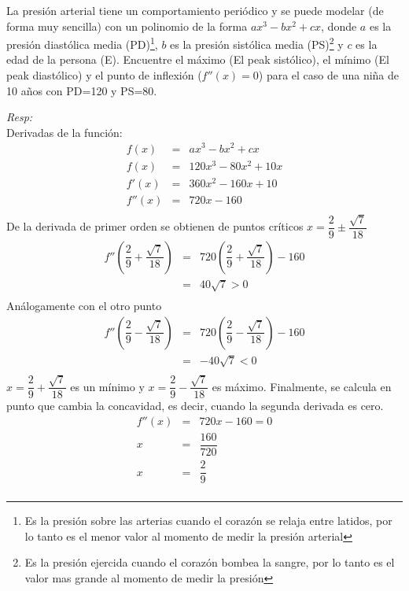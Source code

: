 \begin{myexample}
 La presión arterial tiene un comportamiento periódico y se puede modelar (de forma muy sencilla) con un polinomio de la forma $ax^{3}-bx^{2}+cx$, donde $a$ es la presión diastólica media (PD)\footnote{Es la presión sobre las arterias cuando el corazón se relaja entre latidos, por lo tanto es el menor valor al momento de medir la presión arterial}, $b$ es la presión sistólica media (PS)\footnote{Es la presión ejercida cuando el corazón bombea la sangre, por lo tanto es el valor mas grande al momento de medir la presión} y $c$ es la edad de la persona (E). Encuentre el máximo (El peak sistólico), el mínimo (El peak diastólico) y el punto de inflexión ($f''(x)=0$) para el caso de una niña de 10 años con PD=120 y PS=80.\\
\end{myexample}
\textit{Resp:}\\
Derivadas de la función:
\begin{eqnarray*}
f(x)&=&ax^{3}-bx^{2}+cx\\
f(x)&=&120x^{3}-80x^{2}+10x\\
f'(x)&=&360x^{2}-160x+10\\
f''(x)&=&720x-160\\
\end{eqnarray*}
De la derivada de primer orden se obtienen de puntos críticos $x=\dfrac{2}{9}\pm\dfrac{\sqrt{7}}{18}$
\begin{eqnarray*}
f''\left(\dfrac{2}{9}+\dfrac{\sqrt{7}}{18}\right)&=& 720\left(\dfrac{2}{9}+\dfrac{\sqrt{7}}{18}\right)-160 \\
&=& 40\sqrt{7}>0\\
\end{eqnarray*}
Análogamente con el otro punto
\begin{eqnarray*}
f''\left(\dfrac{2}{9}-\dfrac{\sqrt{7}}{18}\right)&=& 720\left(\dfrac{2}{9}-\dfrac{\sqrt{7}}{18}\right)-160 \\
&=&-40\sqrt{7}<0\\
\end{eqnarray*}
$x=\dfrac{2}{9}+\dfrac{\sqrt{7}}{18}$ es un mínimo y $x=\dfrac{2}{9}-\dfrac{\sqrt{7}}{18}$ es máximo. Finalmente, se calcula en punto que cambia la concavidad, es decir, cuando la segunda derivada es cero.
\begin{eqnarray*}
f''(x)&=&720x-160=0\\
x&=&\dfrac{160}{720}\\
x&=&\dfrac{2}{9}\\
\end{eqnarray*}

